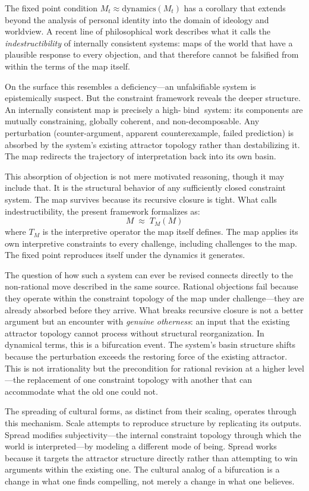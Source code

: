 \documentclass[11pt]{article}
\newcommand{\bind}{\operatorname{bind}}
\begin{document}
The fixed point condition $M_t \approx \mathrm{dynamics}(M_t)$ has a corollary that
extends beyond the analysis of personal identity into the domain of ideology and
worldview. A recent line of philosophical work \citep{rose2023} describes what it calls
the \emph{indestructibility} of internally consistent systems: maps of the world that
have a plausible response to every objection, and that therefore cannot be falsified from
within the terms of the map itself.

On the surface this resembles a deficiency---an unfalsifiable system is epistemically
suspect. But the constraint framework reveals the deeper structure. An internally
consistent map is precisely a high-$\bind$ system: its components are mutually
constraining, globally coherent, and non-decomposable. Any perturbation (counter-argument,
apparent counterexample, failed prediction) is absorbed by the system's existing attractor
topology rather than destabilizing it. The map redirects the trajectory of interpretation
back into its own basin.

This absorption of objection is not mere motivated reasoning, though it may include that.
It is the structural behavior of any sufficiently closed constraint system. The map
survives because its recursive closure is tight. What \citet{rose2023} calls
indestructibility, the present framework formalizes as:
\[
M \;\approx\; T_M(M)
\]
where $T_M$ is the interpretive operator the map itself defines. The map applies its own
interpretive constraints to every challenge, including challenges to the map. The fixed
point reproduces itself under the dynamics it generates.

The question of how such a system can ever be revised connects directly to the
non-rational move described in the same source. Rational objections fail because they
operate within the constraint topology of the map under challenge---they are already
absorbed before they arrive. What breaks recursive closure is not a better argument but
an encounter with \emph{genuine otherness}: an input that the existing attractor topology
cannot process without structural reorganization. In dynamical terms, this is a
bifurcation event. The system's basin structure shifts because the perturbation exceeds
the restoring force of the existing attractor. This is not irrationality but the
precondition for rational revision at a higher level---the replacement of one constraint
topology with another that can accommodate what the old one could not.

The spreading of cultural forms, as distinct from their scaling, operates through this
mechanism. Scale attempts to reproduce structure by replicating its outputs. Spread
modifies subjectivity---the internal constraint topology through which the world is
interpreted---by modeling a different mode of being. Spread works because it targets the
attractor structure directly rather than attempting to win arguments within the existing
one. The cultural analog of a bifurcation is a change in what one finds compelling, not
merely a change in what one believes.
\end{document}
